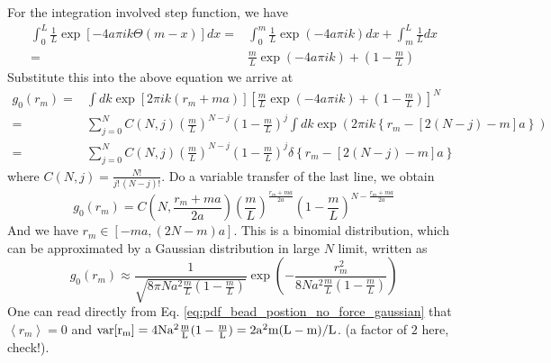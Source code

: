 \documentclass[12pt,a4paper]{article}
\begin{document}
For the integration involved step function, we have
\begin{align*}
    \int_0^L\frac{1}{L}\exp\left[-4a\pi i k\Theta(m-x)\right] d x 
    = & \int_0^m \frac{1}{L} \exp(-4a\pi i k) dx + \int_m^L \frac{1}{L} dx \\
    = & \frac{m}{L} \exp(-4a\pi i k) + \left(1 - \frac{m}{L}\right)
\end{align*}
Substitute this into the above equation we arrive at
\begin{align*}
    g_0(r_m) = & \int dk \exp\left[2\pi i k (r_m + ma)\right]
    \left[\frac{m}{L} \exp(-4a\pi i k) + \left(1 - \frac{m}{L}\right)\right]^N \\
    = & \sum_{j=0}^N C(N, j) \left(\frac{m}{L}\right)^{N-j}
    \left(1-\frac{m}{L}\right)^j \int dk \exp\left(2\pi i k \left\{r_m -\left[2
                (N-j)- m\right]a\right\}\right) \\
    = & \sum_{j=0}^N C(N, j) \left(\frac{m}{L}\right)^{N-j}\left(1-\frac{m}{L}\right)^j 
    \delta\left\{r_m -\left[2(N-j)- m\right]a\right\}
\end{align*}
where $C(N, j) = \frac{N!}{j!\,(N-j)!}$. Do a variable transfer of the last
line, we obtain
\begin{equation}
    \label{eq:pdf_bead_postion_no_force}
    g_0(r_m) = C(N, \frac{r_m + ma}{2a})\left(\frac{m}{L}\right)^{\frac{r_m +
            ma}{2a}}\left(1-\frac{m}{L}\right)^{N - \frac{r_m + ma}{2a}}
\end{equation}
And we have $r_m \in [-ma, (2N-m)a]$. This is a binomial distribution, which can be
approximated by a Gaussian distribution in large $N$ limit, written as
\begin{equation}
    \label{eq:pdf_bead_postion_no_force_gaussian}
    g_0(r_m) \approx \frac{1}{\sqrt{8\pi Na^2 \frac{m}{L}(1-\frac{m}{L})}} \exp\left( -
        \frac{r_m^2}{8 N a^2 \frac{m}{L}(1-\frac{m}{L})}\right)
\end{equation}
One can read directly from Eq. \eqref{eq:pdf_bead_postion_no_force_gaussian}
that $\left<r_m\right> = 0$ and $\rm{var}[r_m] = 4Na^2\frac{m}{L}(1-\frac{m}{L}) =
2a^2m(L-m)/L$. {\color{red} (a factor of $2$ here, check!)}.
\end{document}

